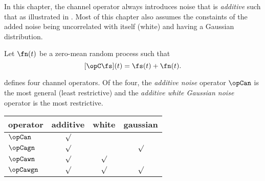 In this chapter, the channel operator always introduces noise
that is {\em additive} such that  
as illustrated in .
Most of this chapter also assumes the constaints of the added
noise being uncorrelated with itself (white) and having a Gaussian distribution.

\begin{definition}
\label{def:opCan}
Let $\fn(t)$ be a zero-mean random process such that
   \[ [\opC \fs](t) = \fs(t) + \fn(t). \]
\end{definition}


 defines four channel operators.
Of the four, the {\em additive noise} operator $\opCan$ is the 
most general (least restrictive) and 
the {\em additive white Gaussian noise} operator is the most restrictive.

\begin{center}
\begin{tabular}{|l|c|c|c|}
  \hline
  operator   & additive & white   & gaussian  \\
\hline
\hline
  $\opCan  $ & $\surd$ &         &          \\
  \cline{2-4}                    
  $\opCagn $ & $\surd$ &         & $\surd$  \\
  \cline{2-4}                    
  $\opCawn $ & $\surd$ & $\surd$ &          \\
  \cline{2-4}                    
  $\opCawgn$ & $\surd$ & $\surd$ & $\surd$  \\
  \hline
\end{tabular}
\end{center}


